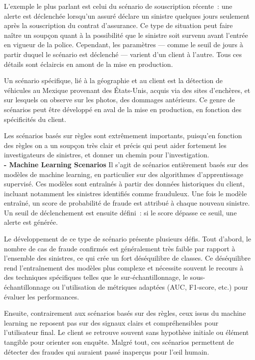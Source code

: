 \documentclass [twoside,openright,a4paper,11pt,french] {report}
\begin{document}
L'exemple le plus parlant est celui du scénario de souscription récente~: une alerte est déclenchée lorsqu'un assuré déclare un sinistre quelques jours seulement 
après la souscription du contrat d'assurance.  
Ce type de situation peut faire naître un soupçon quant à la possibilité que le sinistre soit survenu avant l'entrée en vigueur de la police.  
Cependant, les paramètres — comme le seuil de jours à partir duquel le scénario est déclenché — varient d'un client à l'autre. Tous ces détails 
sont éclaircis en amont de la mise en production. 

Un scénario spécifique, lié à la géographie et au client est la détection de véhicules au Mexique provenant des États-Unis,  
acquis via des sites d'enchères, et sur lesquels on observe sur les photos, des dommages antérieurs.  
Ce genre de scénarios peut être développé en aval de la mise en production, en fonction des spécificités du client. 

Les scénarios basés sur règles sont extrêmement importants, puisqu'en fonction des règles on a un soupçon très clair et précis 
qui peut aider fortement les investigateurs de sinistres, et donner un chemin pour l'investigation. \\


\textbf{- Machine Learning Scenarios}
Il s'agit de scénarios entièrement basés sur des modèles de machine learning, en particulier sur des algorithmes d'apprentissage supervisé.  
Ces modèles sont entraînés à partir des données historiques du client, incluant notamment les sinistres identifiés comme frauduleux.  
Une fois le modèle entraîné, un score de probabilité de fraude est attribué à chaque nouveau sinistre.  
Un seuil de déclenchement est ensuite défini~: si le score dépasse ce seuil, une alerte est générée.

Le développement de ce type de scénario présente plusieurs défis.  
Tout d'abord, le nombre de cas de fraude confirmés est généralement très faible par rapport à l'ensemble des sinistres,  
ce qui crée un fort déséquilibre de classes. Ce déséquilibre rend l'entraînement des modèles plus complexe et nécessite souvent  
le recours à des techniques spécifiques telles que le sur-échantillonnage, le sous-échantillonnage ou l'utilisation de métriques adaptées  
(AUC, F1-score, etc.) pour évaluer les performances.

Ensuite, contrairement aux scénarios basés sur des règles, ceux issus du machine learning ne reposent pas sur des signaux clairs et compréhensibles pour l'utilisateur final.  
Le client se retrouve souvent sans hypothèse initiale ou élément tangible pour orienter son enquête.  
Malgré tout, ces scénarios permettent de détecter des fraudes qui auraient passé inaperçus pour l'œil humain. 
\end{document}
